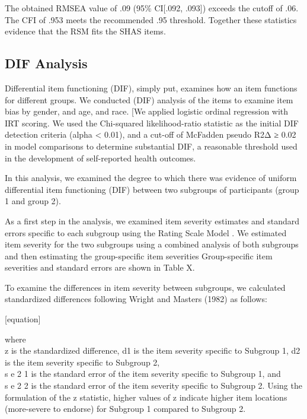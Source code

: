 \documentclass[
]{article}
\begin{document}
The obtained RMSEA value of .09 (95\% CI{[}.092, .093{]}) exceeds the cutoff of .06. The CFI of .953 meets the recommended .95 threshold. Together these statistics evidence that the RSM fits the SHAS items.

\hypertarget{dif-analysis}{%
\subsection{DIF Analysis}\label{dif-analysis}}

Differential item functioning (DIF), simply put, examines how an item functions for different groups. We conducted (DIF) analysis of the items to examine item bias by gender, and age, and race. {[}We applied logistic ordinal regression with IRT scoring. We used the Chi-squared likelihood-ratio statistic as the initial DIF detection criteria (alpha \textless{} 0.01), and a cut-off of McFadden pseudo R2Δ ≥ 0.02 in model comparisons to determine substantial DIF, a reasonable threshold used in the development of self-reported health outcomes.

In this analysis, we examined the degree to which there was evidence of uniform differential item functioning (DIF) between two subgroups of participants (group 1 and group 2).

As a first step in the analysis, we examined item severity estimates and standard errors specific to each subgroup using the Rating Scale Model \citet{Andrich1978}. We estimated item severity for the two subgroups using a combined analysis of both subgroups and then estimating the group-specific item severities Group-specific item severities and standard errors are shown in Table X.

To examine the differences in item severity between subgroups, we calculated standardized differences following Wright and Masters (1982) as follows:

{[}equation{]}

where\\
z
is the standardized difference, d1 is the item severity specific to Subgroup 1, d2 is the item severity specific to Subgroup 2,\\
s
e
2
1
is the standard error of the item severity specific to Subgroup 1, and\\
s
e
2
2
is the standard error of the item severity specific to Subgroup 2. Using the formulation of the z statistic, higher values of z indicate higher item locations (more-severe to endorse) for Subgroup 1 compared to Subgroup 2.
\end{document}
